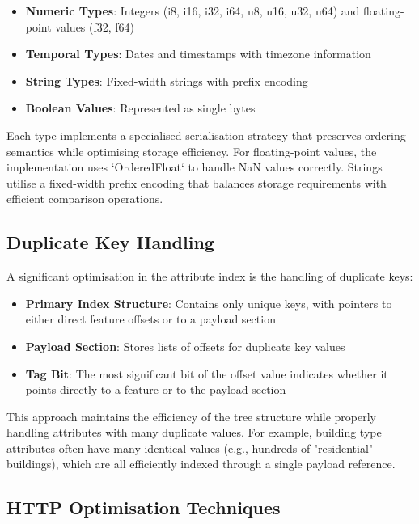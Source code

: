 \begin{itemize}
    \item \textbf{Numeric Types}: Integers (i8, i16, i32, i64, u8, u16, u32, u64) and floating-point values (f32, f64)
    \item \textbf{Temporal Types}: Dates and timestamps with timezone information
    \item \textbf{String Types}: Fixed-width strings with prefix encoding
    \item \textbf{Boolean Values}: Represented as single bytes
\end{itemize}

Each type implements a specialised serialisation strategy that preserves ordering semantics while optimising storage efficiency. For floating-point values, the implementation uses `OrderedFloat` to handle NaN values correctly. Strings utilise a fixed-width prefix encoding that balances storage requirements with efficient comparison operations.

\subsection{Duplicate Key Handling}
\label{subsec:duplicate_key_handling}

A significant optimisation in the attribute index is the handling of duplicate keys:

\begin{itemize}
    \item \textbf{Primary Index Structure}: Contains only unique keys, with pointers to either direct feature offsets or to a payload section
    \item \textbf{Payload Section}: Stores lists of offsets for duplicate key values
    \item \textbf{Tag Bit}: The most significant bit of the offset value indicates whether it points directly to a feature or to the payload section
\end{itemize}

This approach maintains the efficiency of the tree structure while properly handling attributes with many duplicate values. For example, building type attributes often have many identical values (e.g., hundreds of "residential" buildings), which are all efficiently indexed through a single payload reference.

\subsection{HTTP Optimisation Techniques}
\label{subsec:http_optimisation}

